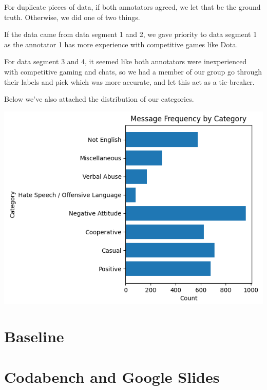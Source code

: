 \documentclass[11pt, letterpaper, notitlepage]{article}
\begin{document}
For duplicate pieces of data, if both annotators agreed, we let that be the ground truth. Otherwise, we did one of two things.

If the data came from data segment 1 and 2, we gave priority to data segment 1 as the annotator 1 has more experience with competitive games like Dota.

For data segment 3 and 4, it seemed like both annotators were inexperienced with competitive gaming and chats, so we had a member of our group go through their labels and pick which was more accurate, and let this act as a tie-breaker.

Below we've also attached the distribution of our categories.

\includegraphics[scale=0.8]{frequency_plot}

\section[3]{Baseline}

\section[4]{Codabench and Google Slides}
\end{document}

